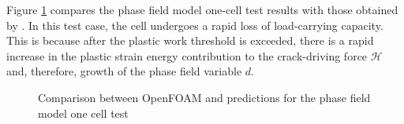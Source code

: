 \documentclass[sn-mathphys,Numbered]{sn-jnl}%
\begin{document}
\begin{appendices}
Figure \ref{fig:one_elem_PF_results} compares the phase field model one-cell test results with those obtained by \citet{borden_phase-field_2016}.
In this test case, the cell undergoes a rapid loss of load-carrying capacity.
This is because after the plastic work threshold is exceeded, there is a rapid increase in the plastic strain energy contribution to the crack-driving force $\mathcal{H}$ and, therefore, growth of the phase field variable $d$.
\begin{figure}[htbp]
	\centering
		\caption{Comparison between OpenFOAM and \citet{borden_phase-field_2016} predictions for the phase field model one cell test}
	\label{fig:one_elem_PF_results}
\end{figure}





\end{appendices}
\end{document}

